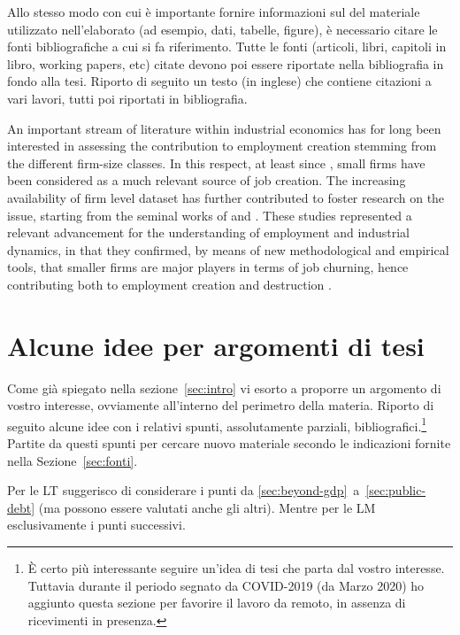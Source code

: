 \documentclass[12pt]{article}
\begin{document}
Allo stesso modo con cui \`e importante fornire informazioni sul del
materiale utilizzato nell'elaborato (ad esempio, dati, tabelle,
figure), \`e necessario citare le fonti bibliografiche a cui si fa
riferimento. Tutte le fonti (articoli, libri, capitoli in libro,
working papers, etc) citate devono poi essere riportate nella
bibliografia in fondo alla tesi. Riporto di seguito un testo (in
inglese) che contiene citazioni a vari lavori, tutti poi riportati in
bibliografia. 

\vspace{0.3cm}

\small{An important stream of literature within industrial
  economics has for long been interested in assessing the contribution
  to employment creation stemming from the different firm-size
  classes. In this respect, at least since \cite{birch_1981}, small
  firms have been considered as a much relevant source of job
  creation. The increasing availability of firm level dataset has
  further contributed to foster research on the issue, starting from
  the seminal works of \cite{davis_haltiwanger_1992} and
  \cite{davis_etal_1996}. These studies represented a relevant
  advancement for the understanding of employment and industrial
  dynamics, in that they confirmed, by means of new methodological and
  empirical tools, that smaller firms are major players in terms of
  job churning, hence contributing both to employment creation and
  destruction \citep[among the others, also refer
  to][]{davis_haltiwanger_1995}.}


\section{Alcune idee per argomenti di tesi}\label{sec:idee-tesi}
Come gi\`a spiegato nella sezione~\ref{sec:intro} vi esorto a proporre
un argomento di vostro interesse, ovviamente all'interno del perimetro
della materia. Riporto di seguito alcune idee con i relativi spunti,
assolutamente parziali, bibliografici.\footnote{\`E certo pi\`u
  interessante seguire un'idea di tesi che parta dal vostro
  interesse. Tuttavia durante il periodo segnato da COVID-2019 (da
  Marzo 2020) ho aggiunto questa sezione per favorire il lavoro da
  remoto, in assenza di ricevimenti in presenza.} Partite da questi
spunti per cercare nuovo materiale secondo le indicazioni fornite
nella Sezione~\ref{sec:fonti}.

Per le LT suggerisco di considerare i punti da
\ref{sec:beyond-gdp}~a~\ref{sec:public-debt} (ma possono essere
valutati anche gli altri). Mentre per le LM esclusivamente i punti
successivi.
\end{document}

